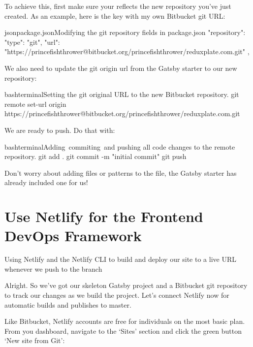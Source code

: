 \documentclass[paper=6in:9in,pagesize=pdftex,headinclude=on,footinclude=on,12pt]{scrbook}
\begin{document}
To achieve this, first make sure your  reflects the new repository you've just created. As an example, here is the  key with my own Bitbucket git URL:

\begin{codeInput}{json}{package.json}{Modifying the git repository fields in package.json}
"repository": {
  "type": "git",
  "url": "https://princefishthrower@bitbucket.org/princefishthrower/reduxplate.com.git"
},
\end{codeInput}

We also need to update the git origin url from the Gatsby starter to our new repository:

\begin{codeInput}{bash}{terminal}{Setting the git original URL to the new Bitbucket repository.}
git remote set-url origin https://princefishthrower@bitbucket.org/princefishthrower/reduxplate.com.git
\end{codeInput}

We are ready to push. Do that with:

\begin{codeInput}{bash}{terminal}{Adding\, commiting\, and pushing all code changes to the remote repository.}
git add .
git commit -m "initial commit"
git push
\end{codeInput}

Don't worry about adding files or patterns to the  file, the Gatsby starter has already included one for us!

\section{Use Netlify for the Frontend DevOps Framework}
\begin{arrows}
\item Using Netlify and the Netlify CLI to build and deploy our site to a live URL whenever we push to the  branch
\end{arrows}

Alright. So we've got our skeleton Gatsby project and a Bitbucket git repository to track our changes as we build the project. Let's connect Netlify now for automatic builds and publishes to master.


Like Bitbucket, Netlify accounts are free for individuals on the most basic plan. From you dashboard, navigate to the `Sites' section and click the green button `New site from Git':
\end{document}
